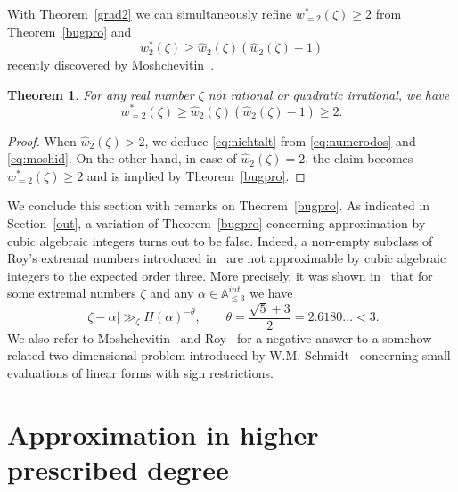 \documentclass[12pt]{amsart}
\newtheorem{theorem}{Theorem}[section]
\theoremstyle{definition}
\begin{document}
With Theorem~\ref{grad2} we can simultaneously 
refine $w_{=2}^{\ast}(\zeta)\geq 2$ from Theorem~\ref{bugpro} and
%
\begin{equation} \label{eq:moshid}
w_{2}^{\ast}(\zeta)\geq \widehat{w}_{2}(\zeta)(\widehat{w}_{2}(\zeta)-1)
\end{equation}
%
recently discovered by Moshchevitin~\cite[Theorem~2]{nimo}.

\begin{theorem}
For any real number $\zeta$ not rational or quadratic irrational, we have
%
\begin{equation} \label{eq:nichtalt}
w_{=2}^{\ast}(\zeta)\geq \widehat{w}_{2}(\zeta)(\widehat{w}_{2}(\zeta)-1)\geq 2.
\end{equation}
%
\end{theorem}

\begin{proof}
When $\widehat{w}_{2}(\zeta)>2$,
we deduce \eqref{eq:nichtalt} from \eqref{eq:numerodos} and \eqref{eq:moshid}.
On the other hand, in case of $\widehat{w}_{2}(\zeta)=2$, the claim becomes $w_{=2}^{\ast}(\zeta)\geq 2$
and is implied by Theorem~\ref{bugpro}.
\end{proof}

We conclude this section with remarks on Theorem~\ref{bugpro}. 
As indicated in Section~\ref{out}, 
a variation of Theorem~\ref{bugpro} concerning approximation by cubic algebraic integers turns out to be false.
Indeed, a non-empty subclass of Roy's extremal numbers introduced
in~\cite{roy} are not approximable
by cubic algebraic integers to the expected order three. More precisely, it was shown in~\cite{roy2} that for some extremal numbers $\zeta$ 
and any $\alpha\in\mathbb{A}_{\leq 3}^{int}$ we have 
%
\begin{equation} \label{eq:damienr}
\vert \zeta-\alpha\vert  \gg_{\zeta} H(\alpha)^{-\theta}, \qquad \theta=\frac{\sqrt{5}+3}{2}= 2.6180\ldots <3.
\end{equation}
%
We also refer to Moshchevitin~\cite{mosh} and Roy~\cite{royneu} for a negative answer to a somehow related two-dimensional
problem introduced by W.M. Schmidt~\cite{wschmidt} concerning 
small evaluations of linear forms with sign restrictions.



\section{Approximation in higher prescribed degree} \label{neures}
\end{document}
